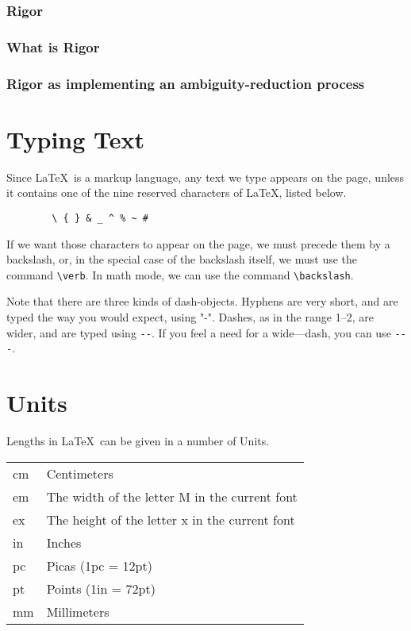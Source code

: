 \documentclass[UTF8]{article}
\begin{document}
		\subsubsection{Rigor}
			\subsubsection{What is Rigor}
			\subsubsection{Rigor as implementing an ambiguity-reduction process}

	
	\section{Typing Text}
	Since \LaTeX\ is a markup language, any text we
	type appears on the page, unless it contains
	one of the nine reserved characters of \LaTeX, listed
	below.
	\begin{verbatim}
		\ { } & _ ^ % ~ #
	\end{verbatim}
	If we want those characters to appear on the page, we
	must precede them by a backslash, or, in the special
	case of the backslash itself, we must use the 
	command \verb(\verb(.  In math mode, we can use the command
	\verb(\backslash(.
	
	Note that there are three kinds of dash-objects.  Hyphens 
	are very short, and are typed the way you would expect, using
	"-".  Dashes, as in the range 1--2, are wider, and are typed
	using \verb+--+.  If you feel a need for a wide---dash, you can
	use \verb+---+.
	
	\section{Units}
	Lengths in \LaTeX\ can be given in a number of Units.\\
	\begin{tabular}{ll}
		cm & Centimeters\\
		em & The width of the letter M in the current font\\
		ex & The height of the letter x in the current font\\
		in & Inches\\
		pc & Picas (1pc = 12pt)\\
		pt & Points (1in = 72pt)\\
		mm & Millimeters
	\end{tabular}
	
\end{document}
